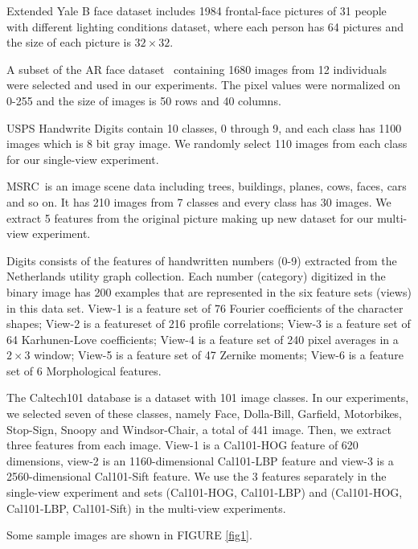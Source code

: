 \documentclass{ieeeaccess}
\begin{document}
Extended Yale B face dataset includes 1984 frontal-face pictures of 31 people with different lighting conditions dataset, where each person has 64 pictures and the size of each picture is $32 \times 32$.

A subset of the AR face dataset~\cite{ref15} containing 1680 images from 12 individuals were selected and used in our experiments. The pixel values were normalized on 0-255 and the size of images is 50 rows and 40 columns.

USPS Handwrite Digits contain 10 classes, 0 through 9, and each class has 1100 images which is 8 bit gray image. We randomly select 110 images from each class for our single-view experiment.

MSRC~\cite{ref16}is an image scene data including trees, buildings, planes, cows, faces, cars and so on. It has 210 images from 7 classes and every class has 30 images. We extract 5 features from the original picture making up new dataset for our multi-view experiment.

Digits consists of the features of handwritten numbers (0-9) extracted from the Netherlands utility graph collection. Each number (category) digitized in the binary image has 200 examples that are represented in the six feature sets (views) in this data set. View-1 is a feature set of 76 Fourier coefficients of the character shapes; View-2 is a featureset of 216 profile correlations; View-3 is a feature set of 64 Karhunen-Love coefficients; View-4 is a feature set of 240 pixel averages in a $2 \times 3$ window; View-5 is a feature set of 47 Zernike moments; View-6 is a feature set of 6 Morphological features.

The Caltech101 database is a dataset with 101 image classes. In our experiments, we selected seven of these classes, namely Face, Dolla-Bill, Garfield, Motorbikes, Stop-Sign, Snoopy and Windsor-Chair, a total of 441 image. Then, we extract three features from each image. View-1 is a Cal101-HOG feature of 620 dimensions, view-2 is an 1160-dimensional Cal101-LBP feature and view-3 is a 2560-dimensional Cal101-Sift feature. We use the 3 features separately in the single-view experiment and  sets (Cal101-HOG, Cal101-LBP) and (Cal101-HOG, Cal101-LBP, Cal101-Sift) in the multi-view experiments.

Some sample images are shown in FIGURE \ref{fig1}.
\end{document}
